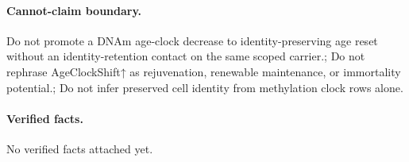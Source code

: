 \paragraph{Cannot-claim boundary.} Do not promote a DNAm age-clock decrease to identity-preserving age reset without an identity-retention contact on the same scoped carrier.; Do not rephrase AgeClockShift↑ as rejuvenation, renewable maintenance, or immortality potential.; Do not infer preserved cell identity from methylation clock rows alone.

\paragraph{Verified facts.}
No verified facts attached yet.
